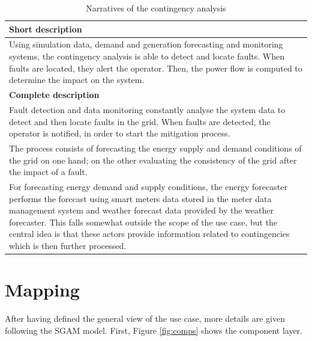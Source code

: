 \begin{table}[!htb]\centering
  \renewcommand{\arraystretch}{2}
  \begin{tabularx}{\linewidth}{|L|}
    \hline
    \textbf{Short description} \\
    \hline
    Using simulation data, demand and generation forecasting and monitoring systems, the contingency analysis is able to detect and locate faults. When faults are located, they alert the operator. Then, the power flow is computed to determine the impact on the system. \\
    \hline
    \textbf{Complete description} \\
    \hline
    Fault detection and data monitoring constantly analyse the system data to detect and then locate faults in the grid. When faults are detected, the operator is notified, in order to start the mitigation process. \\
The process consists of forecasting the energy supply and demand conditions of the grid on one hand; on the other evaluating the consistency of the grid after the impact of a fault. \\
For forecasting energy demand and supply conditions, the energy forecaster performs the forecast using smart meters data stored in the meter data management system and weather forecast data provided by the weather forecaster. This falls somewhat outside the scope of the use case, but the central idea is that these actors provide information related to contingencies which is then further processed. \\
\hline
  \end{tabularx}
  \caption{Narratives of the contingency analysis}
  \label{tab:descr}
\end{table}

\section{Mapping}
After having defined the general view of the use case, more details are given following the SGAM model. First, Figure \ref{fig:comps} shows the component layer.

